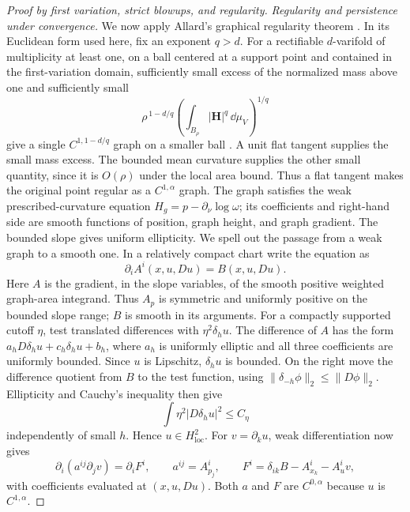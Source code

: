 \begin{proof}[Proof by first variation, strict blowups, and regularity]
\emph{Regularity and persistence under convergence.}
We now apply Allard's graphical regularity theorem \citep{allard1972}.  In its Euclidean form used here,
fix an exponent $q>d$.  For a rectifiable $d$-varifold of multiplicity
at least one, on a ball centered at a support point and contained in
the first-variation domain, sufficiently small excess of the normalized
mass above one and sufficiently small
\[
       \rho^{\,1-d/q}
       \left(\int_{B_\rho}|\mathbf H|^q\,\dd\mu_V\right)^{1/q}
\]
give a single $C^{1,1-d/q}$ graph on a smaller ball
\citep[Chapter~5, Theorem~5.2]{simonGMT}.  A unit flat tangent supplies
the small mass excess.  The bounded mean curvature supplies the other
small quantity, since it is $O(\rho)$ under the local area bound.
Thus a flat tangent makes the original point regular as a
$C^{1,\alpha}$ graph.  The graph satisfies the weak prescribed-curvature
equation
$H_g=p-\partial_\nu\log\omega$; its coefficients and right-hand side
are smooth functions of position, graph height, and graph gradient.
The bounded slope gives uniform ellipticity.  We spell out the passage
from a weak graph to a smooth one.  In a relatively compact chart write
the equation as
\[
 \partial_i A^i(x,u,Du)=B(x,u,Du).
\]
Here $A$ is the gradient, in the slope variables, of the smooth
positive weighted graph-area integrand.  Thus $A_p$ is symmetric and
uniformly positive on the bounded slope range; $B$ is smooth in its
arguments.  For a compactly supported cutoff $\eta$, test translated
differences with $\eta^2\delta_hu$.  The difference of $A$ has the form
$a_hD\delta_hu+c_h\delta_hu+b_h$, where $a_h$ is uniformly elliptic
and all three coefficients are uniformly bounded.  Since $u$ is
Lipschitz, $\delta_hu$ is bounded.  On the right move the difference
quotient from $B$ to the test function, using
$\|\delta_{-h}\phi\|_2\le\|D\phi\|_2$.
Ellipticity and Cauchy's inequality then give
\[
 \int\eta^2|D\delta_hu|^2\le C_\eta
\]
independently of small $h$.  Hence $u\in H^2_{\mathrm{loc}}$.
For $v=\partial_ku$, weak differentiation now gives
\[
 \partial_i(a^{ij}\partial_jv)=\partial_iF^i,\qquad
 a^{ij}=A^i_{p_j},\qquad
 F^i=\delta_{ik}B-A^i_{x_k}-A^i_uv,
\]
with coefficients evaluated at $(x,u,Du)$.  Both $a$ and $F$ are
$C^{0,\alpha}$ because $u$ is $C^{1,\alpha}$.


\end{proof}
